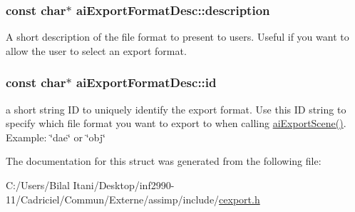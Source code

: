 \subsubsection[{\texorpdfstring{description}{description}}]{\setlength{\rightskip}{0pt plus 5cm}const char$\ast$ ai\+Export\+Format\+Desc\+::description}\hypertarget{structai_export_format_desc_a9c84c4b07c5177fb6539b9bdf90236fb}{}\label{structai_export_format_desc_a9c84c4b07c5177fb6539b9bdf90236fb}
A short description of the file format to present to users. Useful if you want to allow the user to select an export format. 
\subsubsection[{\texorpdfstring{id}{id}}]{\setlength{\rightskip}{0pt plus 5cm}const char$\ast$ ai\+Export\+Format\+Desc\+::id}\hypertarget{structai_export_format_desc_afe216eaea3a04abca041e5c253f94bbf}{}\label{structai_export_format_desc_afe216eaea3a04abca041e5c253f94bbf}
a short string ID to uniquely identify the export format. Use this ID string to specify which file format you want to export to when calling \hyperlink{cexport_8h_a9615510b8430a9da4f435a72148128dd}{ai\+Export\+Scene()}. Example\+: \char`\"{}dae\char`\"{} or \char`\"{}obj\char`\"{} 

The documentation for this struct was generated from the following file\+:\begin{DoxyCompactItemize}
\item 
C\+:/\+Users/\+Bilal Itani/\+Desktop/inf2990-\/11/\+Cadriciel/\+Commun/\+Externe/assimp/include/\hyperlink{cexport_8h}{cexport.\+h}\end{DoxyCompactItemize}
